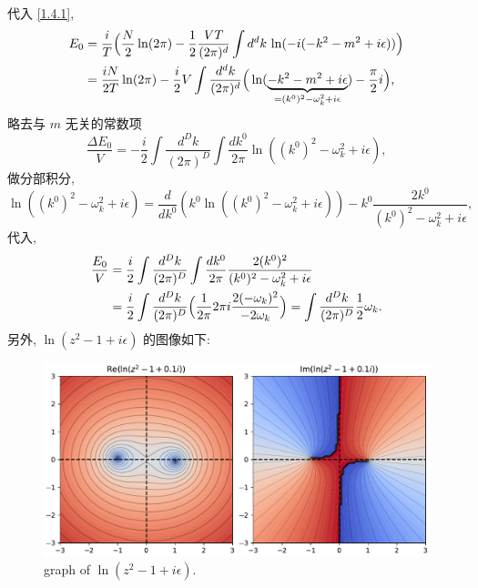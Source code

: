 \begin{itemize}
\begin{tcolorbox}[title=calculation:]
		代入 \eqref{1.4.1},
		\begin{align}
			E_0 &= \frac{i}{T} \Big( \frac{N}{2} \ln (2 \pi) - \frac{1}{2} \frac{V T}{(2 \pi)^d} \int d^d k \, \ln(- i (- k^2 - m^2 + i \epsilon)) \Big) \notag \\
			&= \frac{i N}{2 T} \ln (2 \pi) - \frac{i}{2} V \int \frac{d^d k}{(2 \pi)^d} \Big( \ln(\underbrace{- k^2 - m^2 + i \epsilon}_{= (k^0)^2 - \omega_k^2 + i \epsilon}) - \frac{\pi}{2} i \Big),
		\end{align}
		略去与 $m$ 无关的常数项
		\begin{equation}
			\frac{\Delta E_0}{V} = - \frac{i}{2} \int \frac{d^D k}{(2 \pi)^D} \int \frac{dk^0}{2 \pi} \ln((k^0)^2 - \omega_k^2 + i \epsilon),
		\end{equation}
		做分部积分,
		\begin{equation}
			\ln((k^0)^2 - \omega_k^2 + i \epsilon) = \frac{d}{dk^0} (k^0 \ln((k^0)^2 - \omega_k^2 + i \epsilon)) - k^0 \frac{2 k^0}{(k^0)^2 - \omega_k^2 + i \epsilon},
		\end{equation}
		代入,
		\begin{align}
			\frac{E_0}{V} &= \frac{i}{2} \int \frac{d^D k}{(2 \pi)^D} \int \frac{dk^0}{2 \pi} \frac{2 (k^0)^2}{(k^0)^2 - \omega_k^2 + i \epsilon} \notag \\
			&= \frac{i}{2} \int \frac{d^D k}{(2 \pi)^D} \Big( \frac{1}{2 \pi} 2 \pi i \frac{2 (- \omega_k)^2}{- 2 \omega_k} \Big) = \int \frac{d^D k}{(2 \pi)^D} \frac{1}{2} \omega_k.
		\end{align}
		另外, $\ln(z^2 - 1 + i \epsilon)$ 的图像如下:
		
		\begin{figure}[H]
			\centering
			\includegraphics[scale=0.5]{figures/ln(z^2 - 1 + i epsilon).pdf}
			\caption{graph of $\ln(z^2 - 1 + i \epsilon)$.}
		\end{figure}
	\end{tcolorbox}
\end{itemize}

